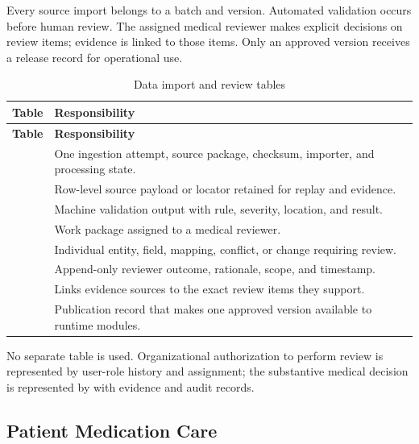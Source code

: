 Every source import belongs to a batch and version. Automated validation occurs before human review. The assigned medical reviewer makes explicit decisions on review items; evidence is linked to those items. Only an approved version receives a release record for operational use.


\begin{longtable}{L{4.5cm}L{10.8cm}}
\caption{Data import and review tables}\label{tab:governance-tables}\\
\toprule
\textbf{Table} & \textbf{Responsibility}\\
\midrule
\endfirsthead
\toprule
\textbf{Table} & \textbf{Responsibility}\\
\midrule
\endhead
{} & One ingestion attempt, source package, checksum, importer, and processing state.\\
 & Row-level source payload or locator retained for replay and evidence.\\
 & Machine validation output with rule, severity, location, and result.\\
 & Work package assigned to a medical reviewer.\\
 & Individual entity, field, mapping, conflict, or change requiring review.\\
 & Append-only reviewer outcome, rationale, scope, and timestamp.\\
 & Links evidence sources to the exact review items they support.\\
 & Publication record that makes one approved version available to runtime modules.\\
\bottomrule
\end{longtable}

No separate  table is used. Organizational authorization to perform review is represented by user-role history and assignment; the substantive medical decision is represented by  with evidence and audit records.

\subsection{Patient Medication Care}

